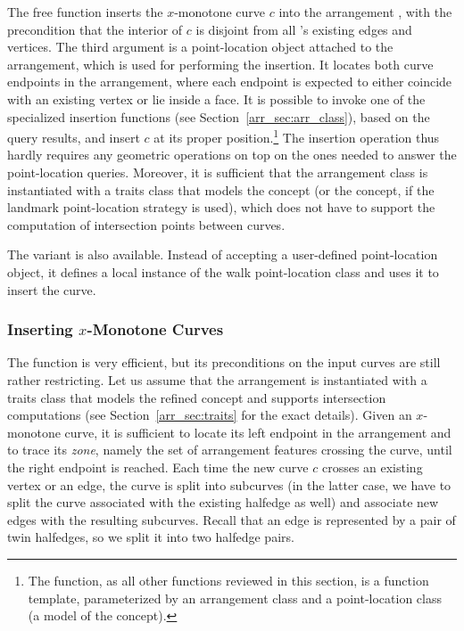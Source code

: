 The free function 
inserts the $x$-monotone curve $c$ into the arrangement ,
with the precondition that the interior of $c$ is disjoint from
all 's existing edges and vertices. The third argument
 is a point-location object attached to the arrangement,
which is used for performing the insertion. It locates both curve
endpoints in the arrangement, where each endpoint is expected to
either coincide with an existing vertex or lie inside a face.
It is possible to invoke one of the specialized insertion functions
(see Section~\ref{arr_sec:arr_class}), based on the query results, and
insert $c$ at its proper position.\footnote{The
 function, as all other functions
reviewed in this section, is a function template, parameterized by an
arrangement class and a point-location class (a model of the
 concept).} The insertion operation
thus hardly requires any geometric operations on top on the ones
needed to answer the point-location queries. Moreover, it is
sufficient that the arrangement class is instantiated with a
traits class that models the 
concept (or the  concept, if the
landmark point-location strategy is used), which does not have to
support the computation of intersection points between curves.

The variant  is also
available. Instead of accepting a user-defined point-location
object, it defines a local instance of the walk point-location
class and uses it to insert the curve.

\subsubsection{Inserting $x$-Monotone Curves\label{arr_sssec:insert_x_mon}}

The  function is very
efficient, but its preconditions on the input curves are still
rather restricting. Let us assume that the arrangement is
instantiated with a traits class that models the refined
 concept and supports
intersection computations (see Section~\ref{arr_sec:traits} for
the exact details). Given an $x$-monotone curve, it is sufficient
to locate its left endpoint in the arrangement and to trace its
{\em zone}, namely the set of arrangement features crossing the curve,
until the right endpoint is reached. Each time the new curve $c$
crosses an existing vertex or an edge, the curve is split into
subcurves (in the latter case, we have to split the curve 
associated with the existing halfedge as well) and associate new
edges with the resulting subcurves. Recall that an edge is represented
by a pair of twin halfedges, so we split it into two halfedge pairs.

